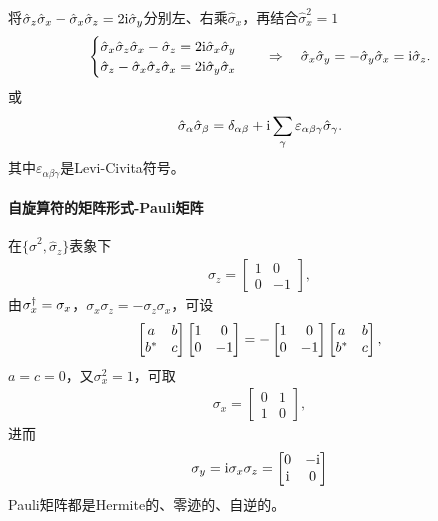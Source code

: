 将$\hat\sigma_z\hat\sigma_x-\hat\sigma_x\hat\sigma_z=2\mathrm{i}\hat\sigma_y$分别左、右乘$\hat\sigma_x$，再结合$\hat\sigma_x^2=1$
\begin{align}
	\begin{cases}
		\hat\sigma_x\hat\sigma_z\hat\sigma_x-\hat\sigma_z=2\mathrm{i}\hat\sigma_x\hat\sigma_y\\
		\hat\sigma_z-\hat\sigma_x\hat\sigma_z\hat\sigma_x=2\mathrm{i}\hat\sigma_y\hat\sigma_x
	\end{cases}\quad\Rightarrow\quad\hat\sigma_x\hat\sigma_y=-\hat\sigma_y\hat\sigma_x=\mathrm{i}\hat\sigma_z.
\end{align}
或
\begin{align}
	\hat\sigma_\alpha\hat\sigma_\beta=\delta_{\alpha\beta}+\mathrm{i}\sum_\gamma\varepsilon_{\alpha\beta\gamma}\hat\sigma_\gamma.
\end{align}
其中$\varepsilon_{\alpha\beta\gamma}$是Levi-Civita符号。
\paragraph*{自旋算符的矩阵形式-Pauli矩阵}在$\{\hat\sigma^2,\hat\sigma_z\}$表象下
\begin{align}
	\sigma_z=\begin{bmatrix}
		1&0\\0&-1
	\end{bmatrix},
\end{align}
由$\sigma_x^\dagger=\sigma_x$，$\sigma_x\sigma_z=-\sigma_z\sigma_x$，可设
\[\begin{bmatrix}
	a&b\\b^\ast&c
\end{bmatrix}\begin{bmatrix}
	1&0\\0&-1
\end{bmatrix}=-\begin{bmatrix}
	1&0\\0&-1
\end{bmatrix}\begin{bmatrix}
	a&b\\b^\ast&c
\end{bmatrix},\]
$a=c=0$，又$\sigma_x^2=1$，可取
\begin{align}
	\sigma_x=\begin{bmatrix}
		0&1\\1&0
	\end{bmatrix},
\end{align}
进而
\begin{align}
	\sigma_y=\mathrm{i}\sigma_x\sigma_z=\begin{bmatrix}
		0&-\mathrm{i}\\\mathrm{i}&0
	\end{bmatrix}
\end{align}
Pauli矩阵都是Hermite的、零迹的、自逆的。
